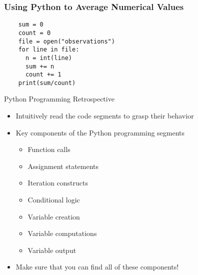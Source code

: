 \documentclass[14pt,aspectratio=169]{beamer}
\begin{document}
%
\begin{frame}[fragile]
  \frametitle{Using Python to Average Numerical Values}
  \hspace*{-.6in}
  \begin{minipage}{6in}
    \begin{verbatim}
    sum = 0
    count = 0
    file = open("observations")
    for line in file:
      n = int(line)
      sum += n
      count += 1
    print(sum/count)
    \end{verbatim}
  \end{minipage}
\end{frame}

%
\begin{frame}{Python Programming Retrospective}
  \begin{itemize}
    \item Intuitively read the code segments to grasp their behavior
      \vspace*{-.15in}
    \item Key components of the Python programming segments
      \begin{itemize}
        \item Function calls
        \item Assignment statements
        \item Iteration constructs
        \item Conditional logic
        \item Variable creation
        \item Variable computations
        \item Variable output
      \end{itemize}
      \vspace*{-.2in}
    \item Make sure that you can find all of these components!
  \end{itemize}
\end{frame}
\end{document}
